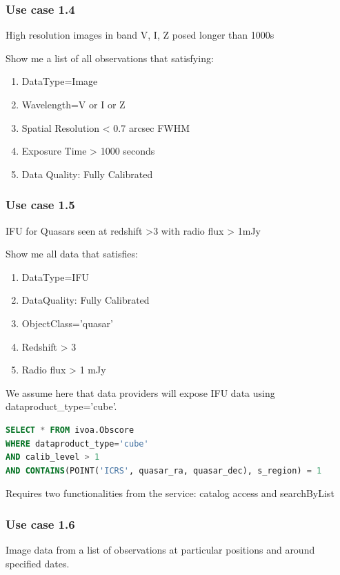 \documentclass[11pt,a4paper]{ivoa}
\begin{document}
\subsubsection[Use case 1.4 ]{Use case 1.4}
High resolution images in band V, I, Z posed longer than 1000s

Show me a list of all observations that satisfying:

\begin{enumerate}
\item DataType=Image
\item Wavelength=V or I or Z
\item Spatial Resolution {\textless} 0.7 arcsec FWHM
\item Exposure Time {\textgreater} 1000 seconds
\item Data Quality: Fully Calibrated
\end{enumerate}
\subsubsection[Use case 1.5]{Use case 1.5}
IFU for Quasars seen at redshift {\textgreater}3 with radio flux {\textgreater} 1mJy

Show me all data that satisfies:

\begin{enumerate}
\item DataType=IFU
\item DataQuality: Fully Calibrated
\item ObjectClass='quasar'
\item Redshift {\textgreater} 3
\item Radio flux {\textgreater} 1 mJy
\end{enumerate}
We assume here that data providers will expose IFU data using dataproduct\_type='cube'.

\begin{lstlisting}[language=SQL,flexiblecolumns=true]
SELECT * FROM ivoa.Obscore
WHERE dataproduct_type='cube'
AND calib_level > 1
AND CONTAINS(POINT('ICRS', quasar_ra, quasar_dec), s_region) = 1
\end{lstlisting}

Requires two functionalities from the service: catalog access and searchByList

\subsubsection[Use case 1.6 ]{Use case 1.6}
Image data from a list of observations at particular positions and around specified dates.
\end{document}
